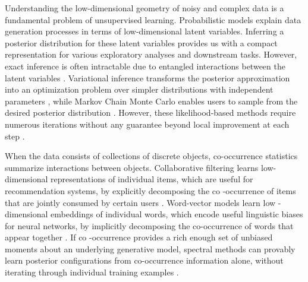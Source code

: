 Understanding the low\hyp{}dimensional geometry of noisy and complex data is a
fundamental problem of unsupervised learning. Probabilistic models explain data
generation processes in terms of low-dimensional latent variables.  Inferring a
posterior distribution for these latent variables provides us with a compact
representation for various exploratory analyses and downstream tasks. However,
exact inference is often intractable due to entangled interactions between the
latent variables \cite{LDA,airoldi2008mixed,erosheva2003bayesian,
pritchard2000inference}. Variational inference transforms the posterior
approximation into an optimization problem over simpler
distributions with independent parameters \cite{JGJS,WJ,blei2017variational},
while Markov Chain Monte Carlo enables users to sample from the desired
posterior distribution \cite{neal1993probabilistic,neal2011mcmc,robert2013monte}.
However, these likelihood-based methods require numerous iterations without any
guarantee beyond local improvement at each step \cite{kulesza2014low}.

When the data consists of collections of discrete objects, co\hyp{}occurrence
statistics summarize interactions between objects. Collaborative filtering
learns low\hyp{}dimensional representations of individual items, which are
useful for recommendation systems, by explicitly decomposing the co
\hyp{}occurrence of items that are jointly consumed by certain users 
\cite{moontae2015nips,liang2016factorization}. Word-vector models learn low
\hyp{}dimensional embeddings of individual words, which encode useful linguistic
biases for neural networks, by implicitly decomposing the co\hyp{}occurrence of
words that appear together \cite{pennington2014glove,levy2014neural}. If co
\hyp{}occurrence provides a rich enough set of unbiased moments about an
underlying generative model, spectral methods can provably learn posterior
configurations from co\hyp{}occurrence information alone, without iterating
through individual training examples \cite{arora2013practical,
anandkumar2012method,hsu2012spectral,AHK}.

